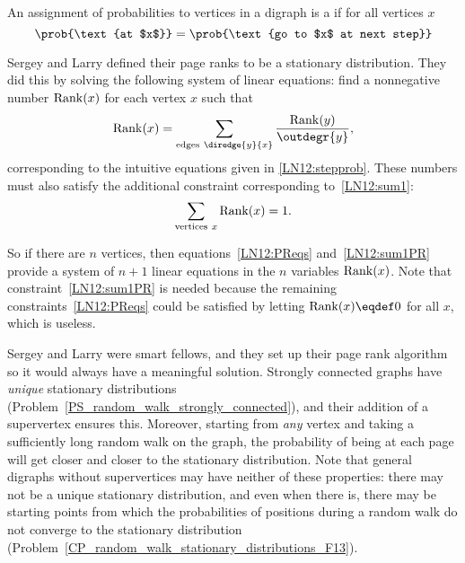 \begin{definition} An assignment of probabilities to vertices in a digraph
  is a  if for all vertices $x$
\[
\prob{\text{at $x$}} = \prob{\text{go to $x$ at next step}}
\]
\end{definition}  

Sergey and Larry defined their page ranks to be a stationary distribution.
They did this by solving the following system of linear equations: find a
nonnegative number $\operatorname{Rank}(x)$ for each vertex $x$ such that
\begin{equation}\label{LN12:PReqs}
\PRnk(x) = \sum_{\text{edges}\ \diredge{y}{x}} \frac{\PRnk(y)}{\outdegr{y}},
\end{equation}
corresponding to the intuitive equations given in \eqref{LN12:stepprob}.
These numbers must also satisfy the additional constraint corresponding
to~\eqref{LN12:sum1}:
\begin{equation}\label{LN12:sum1PR}
\sum_{\text{vertices}\ x} \operatorname{Rank}(x) = 1.
\end{equation}

So if there are $n$ vertices, then equations~\eqref{LN12:PReqs}
and~\eqref{LN12:sum1PR} provide a system of $n+1$ linear equations in the
$n$ variables $\operatorname{Rank}(x)$.  Note that constraint~\eqref{LN12:sum1PR}
is needed because the remaining constraints~\eqref{LN12:PReqs} could be
satisfied by letting $\PRnk(x)\eqdef 0$ for all $x$, which is useless.

Sergey and Larry were smart fellows, and they set up their page rank
algorithm so it would always have a meaningful solution.  Strongly
connected graphs have \emph{unique} stationary distributions
(Problem~\ref{PS_random_walk_strongly_connected}), and their addition
of a supervertex ensures this.  Moreover, starting from \emph{any}
vertex and taking a sufficiently long random walk on the graph, the
probability of being at each page will get closer and closer to the
stationary distribution.  Note that general digraphs without
supervertices may have neither of these properties: there may not be a
unique stationary distribution, and even when there is, there may be
starting points from which the probabilities of positions during a
random walk do not converge to the stationary distribution
(Problem~\ref{CP_random_walk_stationary_distributions_F13}).

